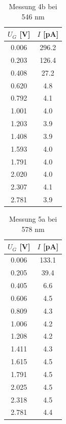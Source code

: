 \documentclass{article}
\begin{document}
\begin{table}[h!]
  \centering
  \begin{tabular}{|c|c|}
      \hline
      $U_G$ [V] & $I$ [pA] \\
      \hline
      0.006 & 296.2 \\
      0.203 & 126.4 \\
      0.408 & 27.2  \\
      0.620 & 4.8   \\
      0.792 & 4.1   \\
      1.001 & 4.0   \\
      1.203 & 3.9   \\
      1.408 & 3.9   \\
      1.593 & 4.0   \\
      1.791 & 4.0   \\
      2.020 & 4.0   \\
      2.307 & 4.1   \\
      2.781 & 3.9   \\
      \hline
  \end{tabular}
  \caption{Messung 4b bei 546 nm}
  \label{tab:messung4b}
\end{table}
\begin{table}[h!]
  \centering
  \begin{tabular}{|c|c|}
      \hline
      $U_G$ [V] & $I$ [pA] \\
      \hline
      0.006 & 133.1 \\
      0.205 & 39.4  \\
      0.405 & 6.6   \\
      0.606 & 4.5   \\
      0.809 & 4.3   \\
      1.006 & 4.2   \\
      1.208 & 4.2   \\
      1.411 & 4.3   \\
      1.615 & 4.5   \\
      1.791 & 4.5   \\
      2.025 & 4.5   \\
      2.318 & 4.5   \\
      2.781 & 4.4   \\
      \hline
  \end{tabular}
  \caption{Messung 5a bei 578 nm}
  \label{tab:messung5a}
\end{table}
\end{document}
